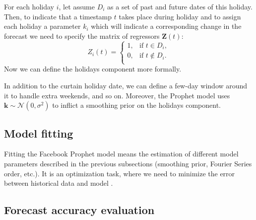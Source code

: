 For each holiday $i$, let assume $D_i$ as a set of past and future dates of this holiday. Then, to indicate that a timestamp $t$ takes place during holiday and to assign each holiday a parameter $k_i$ which will indicate a corresponding change in the forecast we need to specify the matrix of regressors $\mathbf{Z}(t)$: \begin{equation}
    Z_{i}(t)=   \left\{
\begin{array}{ll}
      1, & \text{if } t \in D_i, \\
      0, & \text{if } t \notin D_i. \\
\end{array} 
\right.
\end{equation}
Now we can define the holidays component more formally.

In addition to the curtain holiday date, we can define a few-day window around it to handle extra weekends, and so on. Moreover, the Prophet model uses $\mathbf{k} \sim \mathcal{N}(0, \sigma^2)$ to inflict a smoothing prior on the holidays component.

\subsection{Model fitting}

Fitting the Facebook Prophet model means the estimation of different model parameters described in the previous subsections (smoothing prior, Fourier Series order, etc.). It is an optimization task, where we need to minimize the error between historical data and model \cite{ProphetDoc}.

\subsection{Forecast accuracy evaluation}

